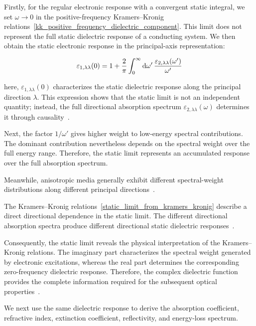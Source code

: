 Firstly, for the regular electronic response with a convergent static integral,
we set $\omega\to0$ in the positive-frequency Kramers--Kronig relations~\eqref{kk_positive_frequency_dielectric_component}.
This limit does not represent the full static dielectric response of a conducting system.
We then obtain the static electronic response in the principal-axis representation:

\begin{equation}
    \varepsilon_{1,\lambda\lambda}(0)
    = 1+\frac{2}{\mathrm{\pi}}
    \int_{0}^{\infty}\mathrm{d}{\omega'}\,
    \frac{\varepsilon_{2,\lambda\lambda}(\omega')}{\omega'}
\label{static_limit_from_kramers_kronig}
\end{equation}

here, $\varepsilon_{1,\lambda\lambda}(0)$ characterizes the static dielectric response along the principal direction $\lambda$.
This expression shows that the static limit is not an independent quantity;
instead, the full directional absorption spectrum $\varepsilon_{2,\lambda\lambda}(\omega)$ determines it through causality~\cite{osanloo2021identification}.

Next, the factor $1/\omega'$ gives higher weight to low-energy spectral contributions.
The dominant contribution nevertheless depends on the spectral weight over the full energy range.
Therefore, the static limit represents an accumulated response over the full absorption spectrum.

Meanwhile, anisotropic media generally exhibit different spectral-weight distributions along different principal directions~\cite{suk2024ultrafast,sun2025recent}.

The Kramers--Kronig relations~\eqref{static_limit_from_kramers_kronig} describe a direct directional dependence in the static limit.
The different directional absorption spectra produce different directional static dielectric responses~\cite{suk2024ultrafast}.

Consequently, the static limit reveals the physical interpretation of the Kramers--Kronig relations.
The imaginary part characterizes the spectral weight generated by electronic excitations, 
whereas the real part determines the corresponding zero-frequency dielectric response.
Therefore, the complex dielectric function provides the complete information required for the subsequent optical properties~\cite{lucarini2005kramers,vandenberghe2023two}.

We next use the same dielectric response to derive the absorption coefficient, refractive index, extinction coefficient, reflectivity, and energy-loss spectrum.

